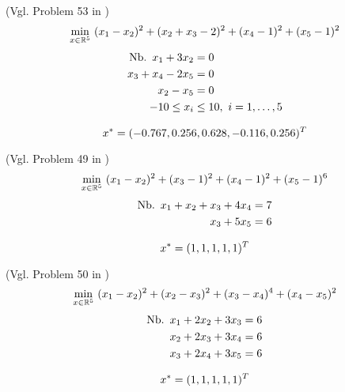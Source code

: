 \begin{testproblem}
(Vgl. Problem 53 in \cite[S.~76]{hock})
\begin{equation}
\min_{x\in\mathbb{R}^5}\ (x_1 - x_2)^2 + (x_2 + x_3 - 2)^2 + (x_4 - 1)^2 + (x_5 - 1)^2
\end{equation}
\begin{equation*}
\begin{split}
\nb x_1 + 3 x_2 & = 0 \\
x_3 + x_4 - 2 x_5 & = 0 \\
x_2 - x_5 & = 0 \\
-10 \leq x_i & \leq 10,\ i = 1,\ldots,5 \\
\end{split}
\end{equation*}

\begin{equation*}
x^* = (-0.767, 0.256, 0.628, -0.116, 0.256)^T
\end{equation*}
\end{testproblem}

\begin{testproblem}
(Vgl. Problem 49 in \cite[S.~72]{hock})
\begin{equation}
\min_{x\in\mathbb{R}^5}\ (x_1-x_2)^2 + (x_3-1)^2 + (x_4-1)^2 + (x_5-1)^6 
\end{equation}
\begin{equation*}
\begin{split}
\nb x_1 + x_2 + x_3 + 4 x_4 & = 7 \\
x_3 + 5 x_5 & = 6 \\
\end{split}
\end{equation*}

\begin{equation*}
x^* = (1, 1, 1, 1, 1)^T
\end{equation*}
\end{testproblem}

\begin{testproblem}
(Vgl. Problem 50 in \cite[S.~73]{hock})
\begin{equation}
\min_{x\in\mathbb{R}^5}\ (x_1-x_2)^2 + (x_2-x_3)^2 + (x_3-x_4)^4 + (x_4-x_5)^2 
\end{equation}
\begin{equation*}
\begin{split}
\nb x_1 + 2 x_2 + 3 x_3 & = 6 \\
x_2 + 2 x_3 + 3 x_4 & = 6 \\
x_3 + 2 x_4 + 3 x_5 & = 6 \\
\end{split}
\end{equation*}

\begin{equation*}
x^* = (1, 1, 1, 1, 1)^T
\end{equation*}
\end{testproblem}

